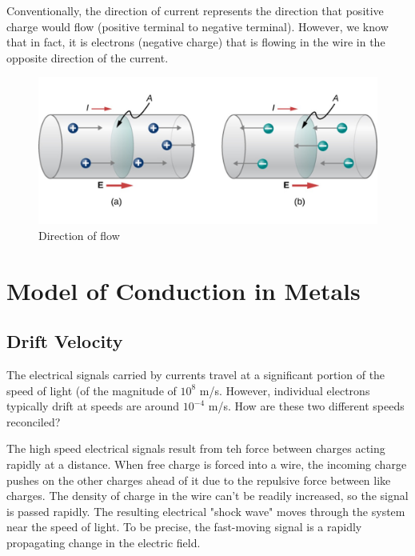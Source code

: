 \documentclass[14pt]{memoir}
\begin{document}
Conventionally, the direction of current represents the direction that positive charge would flow (positive terminal to negative terminal). However, we know that in fact, it is electrons (negative charge) that is flowing in the wire in the opposite direction of the current.

\begin{figure}[H]
\begin{center}
\includegraphics[scale=0.50]{fig/fig_09_06.jpg}
\caption{Direction of flow}
\label{fig:09_06}
\end{center}
\end{figure}

\section{Model of Conduction in Metals}

\subsection{Drift Velocity}

The electrical signals carried by currents travel at a significant portion of the speed of light (of the magnitude of $10^8$ m/s. However, individual electrons typically drift at speeds are around $10^{-4}$ m/s. How are these two different speeds reconciled?

The high speed electrical signals result from teh force between charges acting rapidly at a distance. When free charge is forced into a wire, the incoming charge pushes on the other charges ahead of it due to the repulsive force between like charges. The density of charge in the wire can't be readily increased, so the signal is passed rapidly. The resulting electrical "shock wave" moves through the system near the speed of light. To be precise, the fast-moving signal is a rapidly propagating change in the electric field. 
\end{document}
